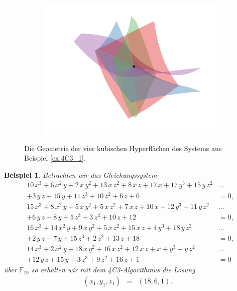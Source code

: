 \documentclass[a4paper,oneside, 11pt, openany%
]{article}
\newcommand{\F}[1]{\mathbb{F}_{#1}}
\theoremstyle{custom}
\theoremstyle{custom}
\newtheorem{example}{Beispiel}[section]
\begin{document}
	\begin{figure}[H]\ContinuedFloat
		\begin{subfigure}[b]{0.8\textwidth}
			\includegraphics[width=\textwidth]{"images/e4c3_example1_zoom.png"}
		\end{subfigure}
		\caption{Die Geometrie der vier kubischen Hyperflächen des \newline Systems aus Beispiel \ref{ex:4C3_1}.}
	\end{figure}
	\begin{example}
		Betrachten wir das Gleichungssystem
		\begin{equation}
			\begin{alignedat}{1}
				10\,x^3+6\,x^2\,y+2\,x\,y^2+13\,x\,z^2+8\,x\,z+17\,x+17\,y^3+15\,y\,z^2&\ldots\\+3\,y\,z+15\,y+11\,z^3+10\,z^2+6\,z+6&=0,\\ 15\,x^3+8\,x^2\,y+5\,x\,y^2+5\,x\,z^2+7\,x\,z+10\,x+12\,y^3+11\,y\,z^2&\ldots\\+6\,y\,z+8\,y+5\,z^3+3\,z^2+10\,z+12&=0,\\ 16\,x^3+14\,x^2\,y+9\,x\,y^2+5\,x\,z^2+15\,x\,z+4\,y^3+18\,y\,z^2&\ldots\\+2\,y\,z+7\,y+15\,z^3+2\,z^2+13\,z+18&=0,\\ 14\,x^3+2\,x^2\,y+18\,x\,y^2+16\,x\,z^2+12\,x\,z+x+y^3+y\,z^2&\ldots\\+12\,y\,z+15\,y+3\,z^3+9\,z^2+16\,z+1&=0
			\end{alignedat}
		\end{equation}
		über $\F{19}$ so erhalten wir mit dem 4C3-Algorithmus die Lösung
		\begin{equation*}
			\begin{alignedat}{5}
				&\left( x_{1},y_{1},z_{1}\right) &=& \left(18, 6, 1 \right).&&
			\end{alignedat}
		\end{equation*}
	\end{example}
\end{document}
